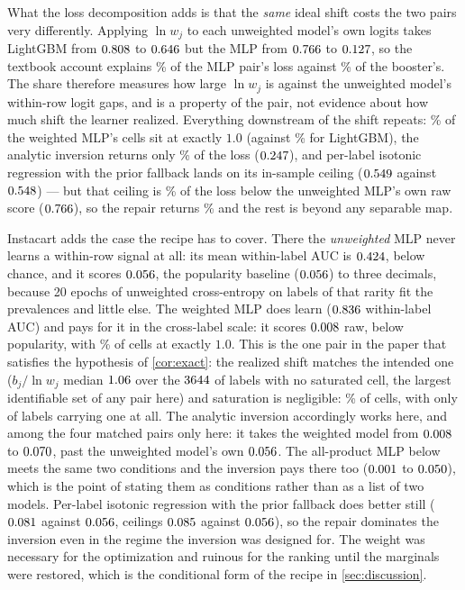 \documentclass[sigconf,nonacm]{acmart}
\begin{document}
What the loss decomposition adds is that the \emph{same} ideal shift costs the two pairs very differently. Applying $\ln w_j$ to each unweighted model's own logits takes LightGBM from $0.808$ to $0.646$ but the MLP from $0.766$ to $0.127$, so the textbook account explains \nModdsShare\% of the MLP pair's loss against \noddsShare\% of the booster's. The share therefore measures how large $\ln w_j$ is against the unweighted model's within-row logit gaps, and is a property of the pair, not evidence about how much shift the learner realized. Everything downstream of the shift repeats: \nMSsatOne\% of the weighted MLP's cells sit at exactly $1.0$ (against \nSsatOne\% for LightGBM), the analytic inversion returns only \nMelkanShare\% of the loss ($0.247$), and per-label isotonic regression with the prior fallback lands on its in-sample ceiling ($0.549$ against $0.548$) --- but that ceiling is \nMtieShare\% of the loss below the unweighted MLP's own raw score ($0.766$), so the repair returns \nMrepairShare\% and the rest is beyond any separable map.

Instacart adds the case the recipe has to cover. There the \emph{unweighted} MLP never learns a within-row signal at all: its mean within-label AUC is $0.424$, below chance, and it scores $0.056$, the popularity baseline ($0.056$) to three decimals, because 20 epochs of unweighted cross-entropy on \nInLabels{} labels of that rarity fit the prevalences and little else. The weighted MLP does learn ($0.836$ within-label AUC) and pays for it in the cross-label scale: it scores $0.008$ raw, below popularity, with \nIMSsatOne\% of cells at exactly $1.0$. This is the one pair in the paper that satisfies the hypothesis of \cref{cor:exact}: the realized shift matches the intended one ($b_j/\ln w_j$ median $1.06$ over the $3644$ of \nInLabels{} labels with no saturated cell, the largest identifiable set of any pair here) and saturation is negligible: \nIMSsatOne\% of cells, with only \nIMSnSatDroppedShift{} of \nInLabels{} labels carrying one at all. The analytic inversion accordingly works here, and among the four matched pairs only here: it takes the weighted model from $0.008$ to $0.070$, past the unweighted model's own $0.056$. The all-product MLP below meets the same two conditions and the inversion pays there too ($0.001$ to $0.050$), which is the point of stating them as conditions rather than as a list of two models. Per-label isotonic regression with the prior fallback does better still ($0.081$ against $0.056$, ceilings $0.085$ against $0.056$), so the repair dominates the inversion even in the regime the inversion was designed for. The weight was necessary for the optimization and ruinous for the ranking until the marginals were restored, which is the conditional form of the recipe in \cref{sec:discussion}.
\end{document}
